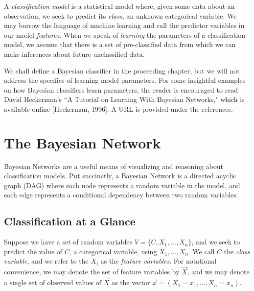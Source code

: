 \documentclass[12pt,twoside]{reedthesis}
\begin{document}
A {\em classification model} is a statistical model where, given some data about an observation, we seek to predict its {\em class}, an unknown categorical variable. We may borrow the language of machine learning and call the predictor variables in our model {\em features}. When we speak of {\em learning} the parameters of a classification model, we assume that there is a set of pre-classified data from which we can make inferences about future unclassified data. 

We shall define a Bayesian classifier in the proceeding chapter, but we will not address the specifics of learning model parameters. For some insightful examples on how Bayesian classifiers learn parameters, the reader is encouraged to read David Heckerman's ``A Tutorial on Learning With Bayesian Networks," which is available online [Heckerman, 1996]. A URL is provided under the references. 

    \chapter{The Bayesian Network}

    	Bayesian Networks are a useful means of visualizing and reasoning about classification models. Put succinctly, a Bayesian Network is a directed acyclic graph (DAG) where each node represents a random variable in the model, and each edge represents a conditional dependency between two random variables.

	\section{Classification at a Glance}

	Suppose we have a set of random variables $V = \{C, X_1, \ldots, X_n\}$, and we seek to predict the value of $C$, a categorical variable, using $X_1, \ldots, X_n$. We call $C$ the {\em class variable}, and we refer to the $X_i$ as the {\em feature variables}. For notational convenience, we may denote the set of feature variables by $\vec{X}$, and we may denote a single set of observed values of $\vec{X}$ as the vector $\vec{x} = (X_1 = x_1, \ldots, X_n = x_n)$.
\end{document}
